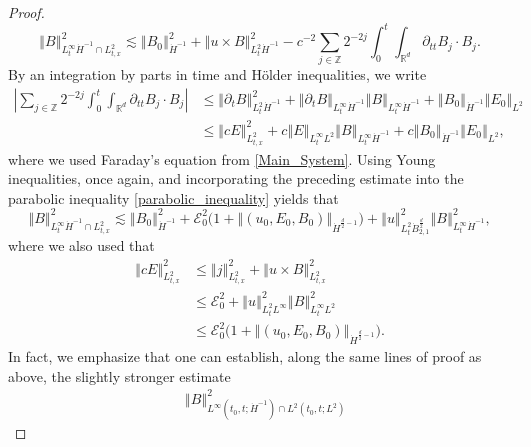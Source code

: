 \documentclass[11pt, leqno, a4paper,]{amsart}
\theoremstyle{remark}
\numberwithin{equation}{section}
\newcommand*{\norm}[1]{\left\Vert #1\right\Vert}
\begin{document}
\begin{proof}
\begin{equation}
 	\norm {B}_{L^\infty_t \dot H^{-1}\cap L^2_{t,x}} ^2 \lesssim \norm {B_0}_{\dot H^{-1}} ^2+  \norm { u\times B}_{L^2_t \dot H^{-1}}^2 - c^{-2} \sum_{j\in \mathbb Z} 2^{-2j} \int_0^t \int_{\mathbb R^d}  \partial_{tt} B_j  \cdot B_j.
 \end{equation}
 By an integration by parts in time and H\"older inequalities, we write 
 \begin{equation*}
 	\begin{aligned}
 		\left|  \sum_ {j\in \mathbb Z} 2^{-2j}	\int_0^t \int_{\mathbb R^d} \partial_{tt} B_j  \cdot B_j \right| 
 		&\leq  \norm {\partial_t B}_{L^2_t \dot H^{-1}}^2 + \norm {\partial_t B}_{L^\infty_t \dot H^{-1}} \norm { B}_{L^\infty_t \dot H^{-1}} + \norm {B_0}_{\dot H^{-1}}\norm {E_0}_{L^2} 
 		\\
 		&\leq \norm {cE}_{L^2_{t,x}}^2 + c\norm {E}_{L^\infty_tL^2} \norm { B}_{L^\infty_t \dot H^{-1}} + c\norm {B_0}_{\dot H^{-1}}\norm {E_0}_{L^2} ,
 	\end{aligned}
 \end{equation*}
 where we used Faraday's equation  from \eqref{Main_System}.
 Using Young inequalities, once again, and incorporating the preceding estimate into the parabolic inequality \eqref{parabolic_inequality}  yields that 
 \begin{equation*}
 	\norm {B}_{L^\infty_t \dot H^{-1}\cap L^2_{t,x}} ^2 \lesssim \norm {B_0}_{\dot H^{-1}} ^2 + \mathcal E_0^2\Big (1+ \norm {(u_0,E_0,B_0)}_{\dot H^{\frac{d}{2}-1}} \Big )  +  \norm { u }_{L^2_t \dot B^{\frac{d}{2}}_{2,1}}^2 \norm {   B}_{L^\infty _t \dot H^{-1}}^2  ,
 \end{equation*}
 where we also used that 
 \begin{equation*}
 	\begin{aligned}
 		\norm {cE}_{L^2_{t,x}}^2 
 		&\leq \norm {j}_{L^2_{t,x}}^2 + \norm {u\times B}_{L^2_{t,x}}^2
 		\\
 		&\leq \mathcal E_0^2 + \norm {u }_{L^2_{t}L^\infty}^2\norm { B}_{L^\infty_t L^2}^2
 		\\
 		&\leq \mathcal E_0^2 \Big (1+ \norm {(u_0,E_0,B_0)}_{\dot H^{\frac{d}{2}-1}} \Big ) .
 	\end{aligned}
 \end{equation*}
 In fact, we emphasize that one can establish, along the same lines of proof as above, the slightly stronger estimate 
 \begin{equation*}
 	\begin{aligned}
 		&\norm {B}_{L^\infty (t_0,t; \dot H^{-1})\cap L^2 (t_0,t; L^2)} ^2 

\end{aligned}
\end{equation*}
\end{proof}
\end{document}
